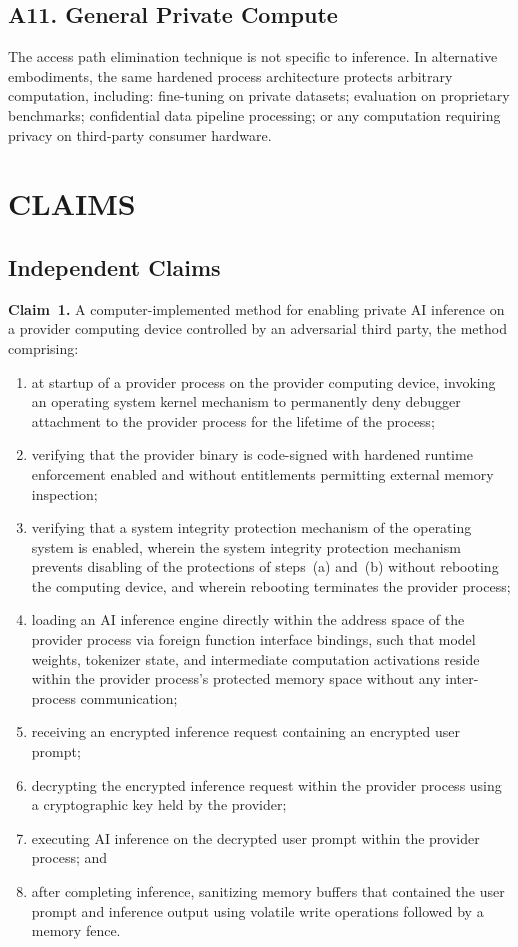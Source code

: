 \documentclass[11pt,letterpaper]{article}
\begin{document}
\subsection{A11. General Private Compute}

The access path elimination technique is not specific to inference. In alternative embodiments, the same hardened process architecture protects arbitrary computation, including: fine-tuning on private datasets; evaluation on proprietary benchmarks; confidential data pipeline processing; or any computation requiring privacy on third-party consumer hardware.

\section{CLAIMS}

\subsection{Independent Claims}

\textbf{Claim~1.} A computer-implemented method for enabling private AI inference on a provider computing device controlled by an adversarial third party, the method comprising:

\begin{enumerate}[label=(\alph*),nosep]
\item at startup of a provider process on the provider computing device, invoking an operating system kernel mechanism to permanently deny debugger attachment to the provider process for the lifetime of the process;
\item verifying that the provider binary is code-signed with hardened runtime enforcement enabled and without entitlements permitting external memory inspection;
\item verifying that a system integrity protection mechanism of the operating system is enabled, wherein the system integrity protection mechanism prevents disabling of the protections of steps~(a) and~(b) without rebooting the computing device, and wherein rebooting terminates the provider process;
\item loading an AI inference engine directly within the address space of the provider process via foreign function interface bindings, such that model weights, tokenizer state, and intermediate computation activations reside within the provider process's protected memory space without any inter-process communication;
\item receiving an encrypted inference request containing an encrypted user prompt;
\item decrypting the encrypted inference request within the provider process using a cryptographic key held by the provider;
\item executing AI inference on the decrypted user prompt within the provider process; and
\item after completing inference, sanitizing memory buffers that contained the user prompt and inference output using volatile write operations followed by a memory fence.
\end{enumerate}
\end{document}

